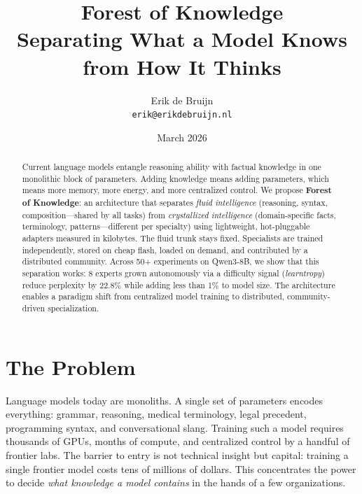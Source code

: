 \documentclass[11pt]{article}
\title{\textbf{Forest of Knowledge}\\[4pt]
\large Separating What a Model Knows from How It Thinks}
\author{Erik de Bruijn\\
\texttt{erik@erikdebruijn.nl}}
\date{March 2026}
\begin{document}
\maketitle

\begin{abstract}
Current language models entangle reasoning ability with factual knowledge in
one monolithic block of parameters. Adding knowledge means adding parameters,
which means more memory, more energy, and more centralized control. We
propose \textbf{Forest of Knowledge}: an architecture that separates
\emph{fluid intelligence} (reasoning, syntax, composition---shared by all
tasks) from \emph{crystallized intelligence} (domain-specific facts,
terminology, patterns---different per specialty) using lightweight,
hot-pluggable adapters measured in kilobytes. The fluid trunk stays fixed.
Specialists are trained independently, stored on cheap flash, loaded on
demand, and contributed by a distributed community. Across 50+ experiments
on Qwen3-8B, we show that this separation works: 8 experts grown
autonomously via a difficulty signal (\emph{learntropy}) reduce perplexity
by 22.8\% while adding less than 1\% to model size. The architecture enables
a paradigm shift from centralized model training to distributed,
community-driven specialization.
\end{abstract}

\section{The Problem}

Language models today are monoliths. A single set of parameters encodes
everything: grammar, reasoning, medical terminology, legal precedent,
programming syntax, and conversational slang. Training such a model requires
thousands of GPUs, months of compute, and centralized control by a handful
of frontier labs. The barrier to entry is not technical insight but capital:
training a single frontier model costs tens of millions of dollars. This
concentrates the power to decide \emph{what knowledge a model contains} in
the hands of a few organizations.
\end{document}
